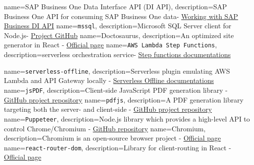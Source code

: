 {
        name=SAP Business One Data Interface API (DI API),
        description={SAP Business One API for consuming SAP Business One data-  \href{https://help.sap.com/doc/saphelpiis_hc_b1_image_repository_development_training_basic_b1_90_tb1300_02_sol_pdf/9.0/en-US/B1_90_TB1300_02_Sol.pdf}{Working with SAP Business DI API}}
}
{
        name=\texttt{mssql},
        description={Microsoft SQL Server client for Node.js-  \href{https://github.com/tediousjs/node-mssql}{Project GitHub}}
}
{
        name=Doctosaurus,
        description={An optimized site generator in React -  \href{https://docusaurus.io/}{Official page}}
}
{
        name=\texttt{AWS Lambda Step Functions},
        description={serverless orchestration service-  \href{https://docs.aws.amazon.com/step-functions/latest/dg/welcome.html}{Step functions documentations}}
}

{
        name=\texttt{serverless-offline},
        description={Serverless plugin emulating AWS Lambda and API Gateway locally  - \href{https://www.serverless.com/plugins/serverless-offline}{Serverless Offline documentations}}
}
{
        name=\texttt{jsPDF},
        description={Client-side JavaScript PDF generation library  - \href{https://github.com/parallax/jsPDF}{GitHub project repository}}
}
{
        name=\texttt{pdfjs},
        description={A PDF generation library targeting both the server- and client-side - \href{https://github.com/rkusa/pdfjs?tab=readme-ov-file}{GitHub project repository}}
}
{
        name=\texttt{Puppeteer},
        description={Node.js library which provides a high-level API to control Chrome/Chromium - \href{https://github.com/puppeteer/puppeteer}{GitHub repository}}
}
{
        name=Chromium,
        description={Chromium is an open-source browser project - \href{https://www.chromium.org/chromium-projects/}{Official page}}
}
{
        name=\texttt{react-router-dom},
        description={Library for client-routing in React - \href{https://reactrouter.com/en/main}{Official page}}
}